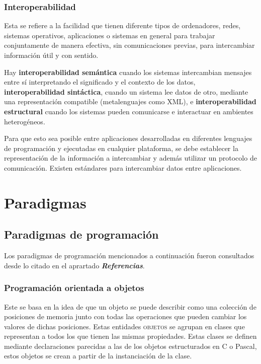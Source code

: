 \documentclass{article}
\begin{document}
\subsubsection{Interoperabilidad}

Esta se refiere a la facilidad que tienen diferente tipos de ordenadores, redes, sistemas operativos, aplicaciones o sistemas en general para trabajar conjuntamente de manera efectiva, sin comunicaciones previas, para intercambiar informaci\'on \'util y con sentido.

Hay \textbf{interoperabilidad sem\'antica} cuando los sistemas intercambian mensajes entre s\'i interpretando el significado y el contexto de los datos, \textbf{interoperabilidad sint\'actica}, cuando un sistema lee datos de otro, mediante una representaci\'on compatible (metalenguajes como XML), e \textbf{interoperabilidad estructural} cuando los sistemas pueden comunicarse e interactuar en ambientes heterog\'eneos.

Para que esto sea posible entre aplicaciones desarrolladas en diferentes lenguajes de programaci\'on y ejecutadas en cualquier plataforma, se debe establecer la representaci\'on de la informaci\'on a intercambiar y adem\'as utilizar un protocolo de comunicaci\'on. Existen est\'andares para intercambiar datos entre aplicaciones.

\section{Paradigmas}

\subsection{Paradigmas de programaci\'on}

Los paradigmas de programaci\'on mencionados a continuaci\'on fueron consultados desde lo citado en el aprartado  \textbf{\textit{Referencias}}.

\subsubsection{Programaci\'on orientada a objetos \cite{lengprog}}

Este se basa en la idea de que un objeto se puede describir como una colecci\'on de posiciones de memoria junto con todas las operaciones que pueden cambiar los valores de dichas posiciones. Estas entidades \textsc{objetos} se agrupan en clases que representan a todos los que tienen las mismas propiedades. Estas clases se definen mediante declaraciones parecidas a las de los objetos estructurados en C o Pascal, estos objetos se crean a partir de la instanciaci\'on de la clase.
\end{document}
